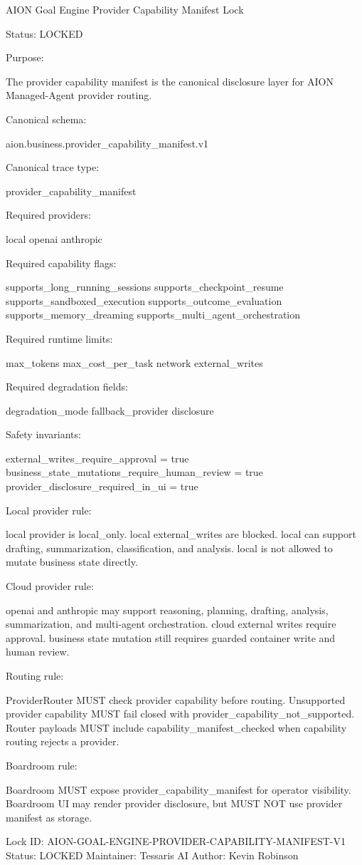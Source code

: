 AION Goal Engine Provider Capability Manifest Lock

Status: LOCKED

Purpose:

The provider capability manifest is the canonical disclosure layer for AION Managed-Agent provider routing.

Canonical schema:

aion.business.provider_capability_manifest.v1

Canonical trace type:

provider_capability_manifest

Required providers:

local
openai
anthropic

Required capability flags:

supports_long_running_sessions
supports_checkpoint_resume
supports_sandboxed_execution
supports_outcome_evaluation
supports_memory_dreaming
supports_multi_agent_orchestration

Required runtime limits:

max_tokens
max_cost_per_task
network
external_writes

Required degradation fields:

degradation_mode
fallback_provider
disclosure

Safety invariants:

external_writes_require_approval = true
business_state_mutations_require_human_review = true
provider_disclosure_required_in_ui = true

Local provider rule:

local provider is local_only.
local external_writes are blocked.
local can support drafting, summarization, classification, and analysis.
local is not allowed to mutate business state directly.

Cloud provider rule:

openai and anthropic may support reasoning, planning, drafting, analysis, summarization, and multi-agent orchestration.
cloud external writes require approval.
business state mutation still requires guarded container write and human review.

Routing rule:

ProviderRouter MUST check provider capability before routing.
Unsupported provider capability MUST fail closed with provider_capability_not_supported.
Router payloads MUST include capability_manifest_checked when capability routing rejects a provider.

Boardroom rule:

Boardroom MUST expose provider_capability_manifest for operator visibility.
Boardroom UI may render provider disclosure, but MUST NOT use provider manifest as storage.

Lock ID: AION-GOAL-ENGINE-PROVIDER-CAPABILITY-MANIFEST-V1
Status: LOCKED
Maintainer: Tessaris AI
Author: Kevin Robinson
